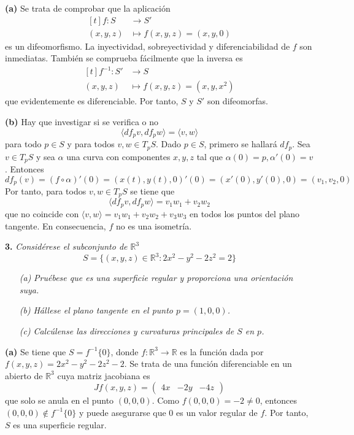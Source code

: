 \documentclass[12pt]{report}
\newcommand{\R}{\mathbb R}
\begin{document}
\vspace{2mm}
\noindent \textbf{(a)} Se trata de comprobar que la aplicación
\[
\begin{aligned}[t]
f \colon S &\longrightarrow S' \\
(x,y,z) & \longmapsto f(x,y,z) = (x,y,0)
\end{aligned}
\]
es un difeomorfismo. La inyectividad, sobreyectividad y diferenciabilidad de $f$ son inmediatas. También se comprueba fácilmente que la inversa es
\[
\begin{aligned}[t]
f^{-1} \colon S' &\longrightarrow S \\
(x,y,z) & \longmapsto f(x,y,z) = (x,y,x^2)
\end{aligned}
\]
que evidentemente es diferenciable. Por tanto, $S$ y $S'$ son difeomorfas.

\vspace{2mm}
\noindent \textbf{(b)} Hay que investigar si se verifica o no
\[\langle df_pv,df_pw \rangle = \langle v,w \rangle\]
para todo $p \in S$ y para todos $v,w \in T_pS$. Dado $p \in S$, primero se hallará $df_p$. Sea $v \in T_pS$ y sea $\alpha$ una curva con componentes $x,y,z$ tal que $\alpha(0)=p, \alpha'(0)=v$. Entonces
\[df_p(v) = (f \circ \alpha)'(0) = (x(t),y(t),0)'(0) = (x'(0),y'(0),0) = (v_1,v_2,0)\]
Por tanto, para todos $v,w \in T_pS$ se tiene que
\[\langle df_pv, df_pw \rangle = v_1w_1+v_2w_2\]
que no coincide con $\langle v,w \rangle = v_1w_1+v_2w_2+v_3w_3$ en todos los puntos del plano tangente. En consecuencia, $f$ no es una isometría.

\vspace{4mm}
\noindent \textbf{3. } \textit{Considérese el subconjunto de $\R^3$
\[S =\{(x,y,z) \in \R^3  \colon 2x^2-y^2-2z^2 = 2\}\]}
\begin{itemize}
    \item[\textit{(a)}] \textit{Pruébese que es una superficie regular y proporciona una orientación suya.}
    \item[\textit{(b)}] \textit{Hállese el plano tangente en el punto $p = (1,0,0)$.}
    \item[\textit{(c)}] \textit{Calcúlense las direcciones y curvaturas principales de $S$ en $p$.}
\end{itemize}

\noindent \textbf{(a) } Se tiene que $S = f^{-1}\{0\}$, donde $f \colon \R^3 \to \R$ es la función dada por $f(x,y,z) = 2x^2-y^2-2z^2-2$. Se trata de una función diferenciable en un abierto de $\R^3$ cuya matriz jacobiana es
\[Jf(x,y,z) =\begin{pmatrix}
    4x & -2y & -4z
\end{pmatrix}\]
que solo se anula en el punto $(0,0,0)$. Como $f(0,0,0) = -2 \neq 0$, entonces $(0,0,0) \notin f^{-1}\{0\}$ y puede asegurarse que $0$ es un valor regular de $f$. Por tanto, $S$ es una superficie regular.
\end{document}
